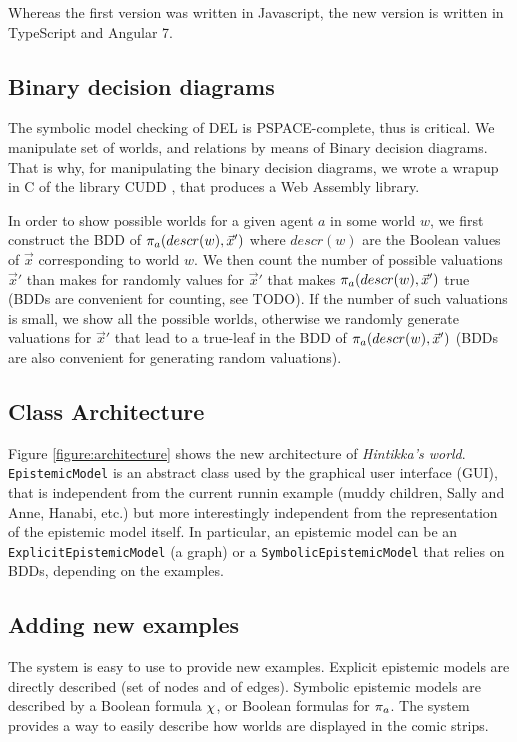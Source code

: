 
Whereas the first version was written in Javascript, the new version is written in TypeScript and Angular 7.

\subsection{Binary decision diagrams}

The symbolic model checking of DEL is PSPACE-complete, thus is critical. We manipulate set of worlds, and relations by means of Binary decision diagrams. That is why, for manipulating the binary decision diagrams, we wrote a wrapup in C of the library CUDD \cite{}, that produces a Web Assembly library.

In order to show possible worlds for a given agent $a$ in some world $w$, we first construct the BDD of $\pi_{a}(descr(w), \vec x')$ where $descr(w)$ are the Boolean values of $\vec x$ corresponding to world $w$. We then count the number of possible valuations $\vec x'$ than makes for randomly values for $\vec x'$ that makes $\pi_{a}(descr(w), \vec x')$ true (BDDs are convenient for counting, see TODO). If the number of such valuations is small, we show all the possible worlds, otherwise we randomly generate valuations for $\vec x'$ that lead to a true-leaf in the BDD of $\pi_{a}(descr(w), \vec x')$ (BDDs are also convenient for generating random valuations).

\subsection{Class Architecture}

Figure \ref{figure:architecture} shows the new architecture of \emph{Hintikka's world}. \texttt{EpistemicModel} is an abstract class used by the graphical user interface (GUI), that is independent from the current runnin example (muddy children, Sally and Anne, Hanabi, etc.) but more interestingly independent from the representation of the epistemic model itself. In particular, an epistemic model can be an \texttt{ExplicitEpistemicModel} (a graph) or a \texttt{SymbolicEpistemicModel} that relies on BDDs, depending on the examples.


\subsection{Adding new examples}

The system is easy to use to provide new examples. Explicit epistemic models are directly described (set of nodes and of edges). Symbolic epistemic models are described by a Boolean formula $\chi$, or Boolean formulas for $\pi_{a}$. The system provides a way to easily describe how worlds are displayed in the comic strips.


